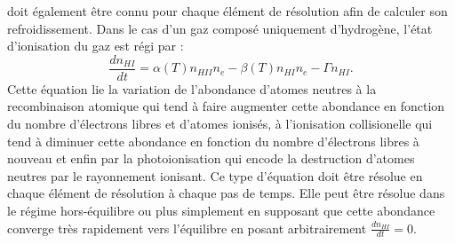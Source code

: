  doit également être connu pour chaque élément de résolution afin de calculer son refroidissement. Dans le cas d'un gaz composé uniquement d'hydrogène, l'état d'ionisation du gaz est régi par :
\begin{equation}
\frac{dn_{HI}}{dt}=\alpha(T) n_{HII} n_e-\beta(T) n_{HI}n_e-\Gamma n_{HI}.
\label{e:eint}
\end{equation}
Cette équation lie la variation de l'abondance d'atomes neutres à la recombinaison atomique  qui tend à faire augmenter cette abondance en fonction du nombre d'électrons libres et d'atomes ionisés, à l'ionisation collisionelle  qui tend à diminuer cette abondance en fonction du nombre d'électrons libres à nouveau et enfin par la photoionisation  qui encode la destruction d'atomes neutres par le rayonnement ionisant. Ce type d'équation doit être résolue en chaque élément de résolution à chaque pas de temps. Elle peut être résolue dans le régime hors-équilibre  ou plus simplement en supposant que cette abondance converge très rapidement vers l'équilibre en posant arbitrairement $\frac{dn_{HI}}{dt}=0$.

